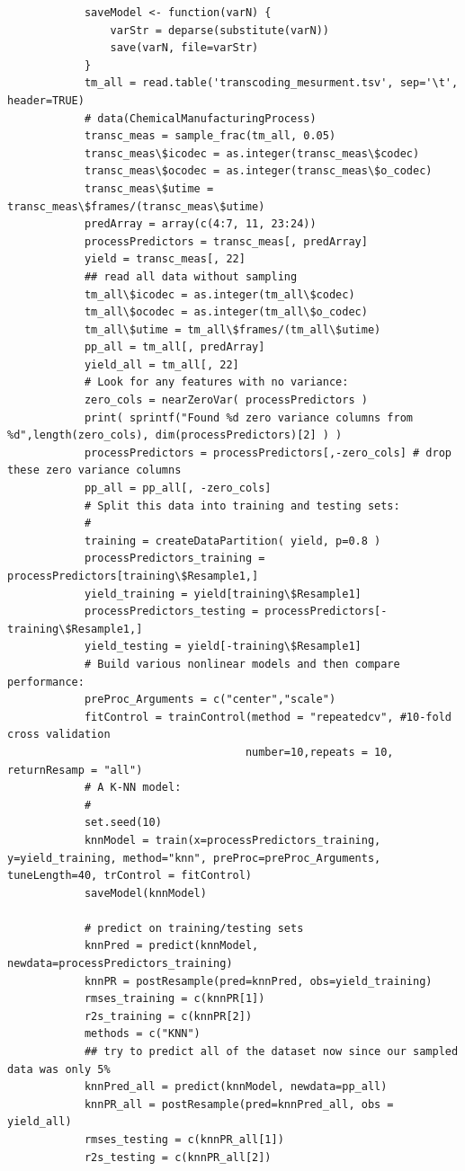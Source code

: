 \documentclass[letterpaper,12pt,titlepage,oneside,final]{report}
\begin{document}
\begin{multicols}{2}
\begin{verbatim}
            saveModel <- function(varN) {
                varStr = deparse(substitute(varN))
                save(varN, file=varStr)
            }
            tm_all = read.table('transcoding_mesurment.tsv', sep='\t', header=TRUE)
            # data(ChemicalManufacturingProcess)
            transc_meas = sample_frac(tm_all, 0.05)
            transc_meas\$icodec = as.integer(transc_meas\$codec)
            transc_meas\$ocodec = as.integer(transc_meas\$o_codec)
            transc_meas\$utime = transc_meas\$frames/(transc_meas\$utime)
            predArray = array(c(4:7, 11, 23:24))
            processPredictors = transc_meas[, predArray]
            yield = transc_meas[, 22]
            ## read all data without sampling
            tm_all\$icodec = as.integer(tm_all\$codec)
            tm_all\$ocodec = as.integer(tm_all\$o_codec)
            tm_all\$utime = tm_all\$frames/(tm_all\$utime)
            pp_all = tm_all[, predArray]
            yield_all = tm_all[, 22]
            # Look for any features with no variance:
            zero_cols = nearZeroVar( processPredictors )
            print( sprintf("Found %d zero variance columns from %d",length(zero_cols), dim(processPredictors)[2] ) )
            processPredictors = processPredictors[,-zero_cols] # drop these zero variance columns 
            pp_all = pp_all[, -zero_cols]
            # Split this data into training and testing sets:
            #
            training = createDataPartition( yield, p=0.8 )
            processPredictors_training = processPredictors[training\$Resample1,]
            yield_training = yield[training\$Resample1]
            processPredictors_testing = processPredictors[-training\$Resample1,]
            yield_testing = yield[-training\$Resample1]
            # Build various nonlinear models and then compare performance:
            preProc_Arguments = c("center","scale")
            fitControl = trainControl(method = "repeatedcv", #10-fold cross validation
                                     number=10,repeats = 10, returnResamp = "all")
            # A K-NN model:
            # 
            set.seed(10)
            knnModel = train(x=processPredictors_training, y=yield_training, method="knn", preProc=preProc_Arguments, tuneLength=40, trControl = fitControl)
            saveModel(knnModel)

            # predict on training/testing sets
            knnPred = predict(knnModel, newdata=processPredictors_training)
            knnPR = postResample(pred=knnPred, obs=yield_training)
            rmses_training = c(knnPR[1])
            r2s_training = c(knnPR[2])
            methods = c("KNN")
            ## try to predict all of the dataset now since our sampled data was only 5%
            knnPred_all = predict(knnModel, newdata=pp_all)
            knnPR_all = postResample(pred=knnPred_all, obs = yield_all)
            rmses_testing = c(knnPR_all[1])
            r2s_testing = c(knnPR_all[2])


\end{verbatim}
\end{multicols}
\end{document}
